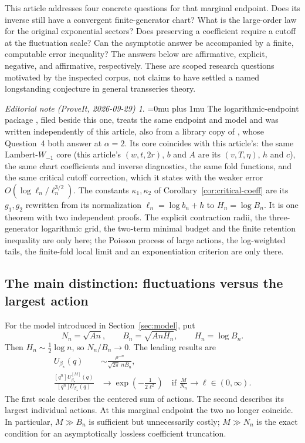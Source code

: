 \documentclass[11pt,a4paper]{article}
\numberwithin{equation}{section}
\theoremstyle{definition}
\theoremstyle{remark}
\newtheorem*{ednoteinner}{Editorial note (ProveIt, 2026-09-29)}
\newenvironment{ednote}{\begin{ednoteinner}\sloppy\Urlmuskip=0mu plus 1mu\relax}{\end{ednoteinner}}
\newcommand{\bs}{\beta_\star}
\begin{document}
This article addresses four concrete questions for that marginal endpoint.
Does its inverse still have a convergent finite-generator chart? What is the
large-order law for the original exponential sectors? Does preserving a
coefficient require a cutoff at the fluctuation scale? Can the asymptotic
answer be accompanied by a finite, computable error inequality? The answers
below are affirmative, explicit, negative, and affirmative, respectively.
These are scoped research questions motivated by the inspected corpus, not
claims to have settled a named longstanding conjecture in general transseries
theory.
\begin{ednote}
The logarithmic-endpoint package \cite{ed:lce}, filed beside this one,
treats the same endpoint and model and was written independently of this
article, also from a library copy of \cite{prior-stable}, whose Question~4
both answer at $\alpha=2$. Its core coincides with this article's: the same
Lambert-$W_{-1}$ core (this article's $(w,t,2r)$, $b$ and $A$ are its
$(v,T,\eta)$, $h$ and $c$), the same chart coefficients and inverse
diagnostics, the same fold functions, and the same critical cutoff
correction, which it states with the weaker error
$O(\log\ell_n/\ell_n^{3/2})$. The constants $\kappa_1,\kappa_2$ of
Corollary~\ref{cor:critical-coeff} are its $g_1,g_2$ rewritten from its
normalization $\ell_n=\log b_n+h$ to $H_n=\log B_n$. It is one theorem with
two independent proofs. The explicit contraction radii, the three-generator
logarithmic grid, the two-term minimal budget and the finite retention
inequality are only here; the Poisson process of large actions, the
log-weighted tails, the finite-fold local limit and an exponentiation
criterion are only there.
\end{ednote}

\subsection{The main distinction: fluctuations versus the largest action}
For the model introduced in Section~\ref{sec:model}, put
\[
 N_n=\sqrt{An},\qquad B_n=\sqrt{AnH_n},\qquad H_n=\log B_n.
\]
Then \(H_n\sim\tfrac12\log n\), so \(N_n/B_n\to0\). The leading results are
\begin{align}
 [q^n]U_{\bs}(q)
 &\sim \frac{\rho^{-n}}{\sqrt{2\pi}\,nB_n},\label{eq:intro-coeff}\\
 \frac{[q^n]U_{\bs}^{[M]}(q)}{[q^n]U_{\bs}(q)}
 &\longrightarrow \exp\!\left(-\frac{1}{2\ell^2}\right)
 \quad\text{if }\frac{M}{N_n}\to\ell\in(0,\infty).\label{eq:intro-cut}
\end{align}
The first scale describes the centered sum of actions. The second describes
its largest individual actions. At this marginal endpoint the two no longer
coincide. In particular, \(M\gg B_n\) is sufficient but unnecessarily costly;
\(M\gg N_n\) is the exact condition for an asymptotically lossless coefficient
truncation.
\end{document}
